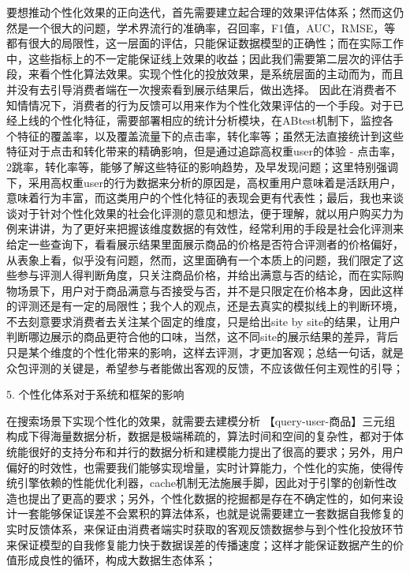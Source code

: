 要想推动个性化效果的正向迭代，首先需要建立起合理的效果评估体系；然而这仍然是一个很大的问题，学术界流行的准确率，召回率，F1值，AUC，RMSE，等都有很大的局限性，这一层面的评估，只能保证数据模型的正确性；而在实际工作中，这些指标上的不一定能保证线上效果的收益；因此我们需要第二层次的评估手段，来看个性化算法效果。实现个性化的投放效果，是系统层面的主动而为，而且并没有去引导消费者端在一次搜索看到展示结果后，做出选择。 因此在消费者不知情情况下，消费者的行为反馈可以用来作为个性化效果评估的一个手段。对于已经上线的个性化特征，需要部署相应的统计分析模块，在ABtest机制下，监控各个特征的覆盖率，以及覆盖流量下的点击率，转化率等；虽然无法直接统计到这些特征对于点击和转化带来的精确影响，但是通过追踪高权重user的体验 - 点击率，2跳率，转化率等，能够了解这些特征的影响趋势，及早发现问题；这里特别强调下，采用高权重user的行为数据来分析的原因是，高权重用户意味着是活跃用户，意味着行为丰富，而这类用户的个性化特征的表现会更有代表性；最后，我也来谈谈对于针对个性化效果的社会化评测的意见和想法，便于理解，就以用户购买力为例来讲讲，为了更好来把握该维度数据的有效性，经常利用的手段是社会化评测来给定一些查询下，看看展示结果里面展示商品的价格是否符合评测者的价格偏好，从表象上看，似乎没有问题，然而，这里面确有一个本质上的问题，我们限定了这些参与评测人得判断角度，只关注商品价格，并给出满意与否的结论，而在实际购物场景下，用户对于商品满意与否接受与否，并不是只限定在价格本身，因此这样的评测还是有一定的局限性；我个人的观点，还是去真实的模拟线上的判断环境，不去刻意要求消费者去关注某个固定的维度，只是给出site by site的结果，让用户判断哪边展示的商品更符合他的口味，当然，这不同site的展示结果的差异，背后只是某个维度的个性化带来的影响，这样去评测，才更加客观；总结一句话，就是众包评测的关键是，希望参与者能做出客观的反馈，不应该做任何主观性的引导；

5. 个性化体系对于系统和框架的影响

在搜索场景下实现个性化的效果，就需要去建模分析 【query-user-商品】三元组构成下得海量数据分析，数据是极端稀疏的，算法时间和空间的复杂性，都对于体统能很好的支持分布和并行的数据分析和建模能力提出了很高的要求；另外，用户偏好的时效性，也需要我们能够实现增量，实时计算能力，个性化的实施，使得传统引擎依赖的性能优化利器，cache机制无法施展手脚，因此对于引擎的创新性改造也提出了更高的要求；另外，个性化数据的挖掘都是存在不确定性的，如何来设计一套能够保证误差不会累积的算法体系，也就是说需要建立一套数据自我修复的实时反馈体系，来保证由消费者端实时获取的客观反馈数据参与到个性化投放环节来保证模型的自我修复能力快于数据误差的传播速度；这样才能保证数据产生的价值形成良性的循环，构成大数据生态体系；



